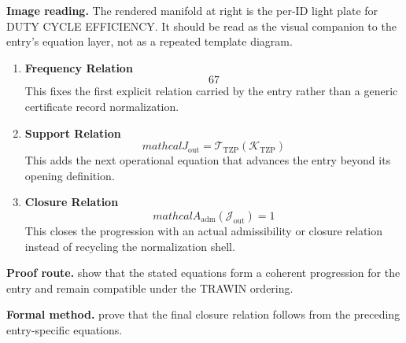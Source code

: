 \begin{samepage}
\noindent\begin{minipage}[t]{0.45\linewidth}
\vspace{0pt}
\raggedright
\scriptsize\textbf{Image reading.} The rendered manifold at right is the per-ID light plate for DUTY CYCLE EFFICIENCY. It should be read as the visual companion to the entry's equation layer, not as a repeated template diagram.\par
\end{minipage}\hfill
\begin{minipage}[t]{0.53\linewidth}
\vspace*{-0.10in}
\raggedright
{}
\end{minipage}
\end{samepage}

\clearpage


\begin{enumerate}[leftmargin=1.6em,itemsep=9pt,topsep=6pt]
\item \textbf{Frequency Relation}
\[
67%
\]
This fixes the first explicit relation carried by the entry rather than a generic certificate record normalization.

\item \textbf{Support Relation}
\[
mathcal{J}_{\mathrm{out}} = \mathcal{T}_{\mathrm{TZP}}\!\left(\mathcal{K}_{\mathrm{TZP}}\right)
\]
This adds the next operational equation that advances the entry beyond its opening definition.

\item \textbf{Closure Relation}
\[
mathcal{A}_{\mathrm{adm}}\!\left(\mathcal{J}_{\mathrm{out}}\right)=1
\]
This closes the progression with an actual admissibility or closure relation instead of recycling the normalization shell.
\end{enumerate}

\textbf{Proof route.} show that the stated equations form a coherent progression for the entry and remain compatible under the TRAWIN ordering.

\textbf{Formal method.} prove that the final closure relation follows from the preceding entry-specific equations.

